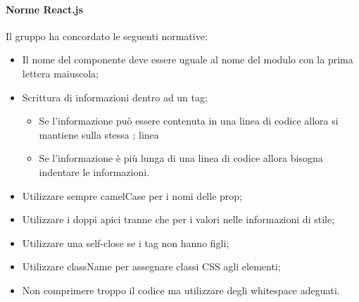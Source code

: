 \paragraph{Norme React.js}
	Il gruppo ha concordato le seguenti normative:
	\begin{itemize}
	\item Il nome del componente deve essere uguale al nome del modulo con la prima lettera maiuscola;
	\item Scrittura di informazioni dentro ad un tag;
		\begin{itemize}
			\item Se l’informazione può essere contenuta in una linea di codice allora si mantiene sulla stessa ;		linea
			\item Se l’informazione è più lunga di una linea di codice allora bisogna indentare le informazioni.
		\end{itemize}
		\item Utilizzare sempre camelCase per i nomi delle prop;
		\item Utilizzare i doppi apici tranne che per i valori nelle informazioni di stile;
		\item Utilizzare una self-close se i tag non hanno figli;
		\item Utilizzare className per assegnare classi CSS agli elementi;
		\item Non comprimere troppo il codice ma utilizzare degli whitespace adeguati.
	\end{itemize}
	
